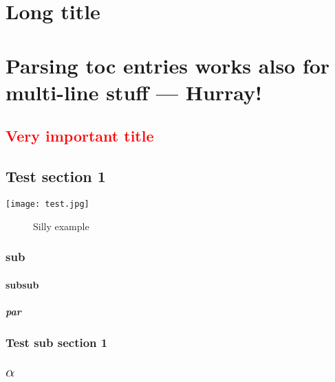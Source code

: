 
\chapter[Short title]{Long title}

\chapter{Parsing {toc entries works
  also for} multi-line \texorpdfstring{stuff}{entries}
--- Hurray!}

\section{\texorpdfstring{\textcolor{red}{Very important title}} {Very important title}}
\label{sec:test2}

\section{Test section 1}\label{sec:TesSec1}

\texttt{[image: test.jpg]}

\begin{figure}[htpb]
  \centering
  
  \caption{Silly example}
  \label{fig:example1}
\end{figure}

\subsection{sub}

\subsubsection{subsub}

\paragraph{par}

\subsection{Test sub section 1}

\section{$\alpha$}

